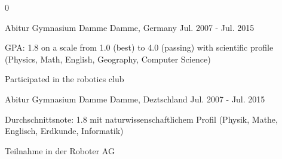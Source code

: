 \begin{cventries}
\multilang
  {0}
  {\cventry
    {Abitur} %
    {Gymnasium Damme} %
    {Damme, Germany} %
    {Jul. 2007 - Jul. 2015} %
    {
      \begin{cvitems} %
        \item {GPA: 1.8 on a scale from 1.0 (best) to 4.0 (passing) with scientific profile (Physics, Math, English, Geography, Computer Science)}
        \item {Participated in the robotics club}
      \end{cvitems}
    }
  }{\cventry
    {Abitur} %
    {Gymnasium Damme} %
    {Damme, Deztschland} %
    {Jul. 2007 - Jul. 2015} %
    {
      \begin{cvitems} %
        \item {Durchschnittsnote: 1.8 mit naturwissenschaftlichem Profil (Physik, Mathe, Englisch, Erdkunde, Informatik)}
        \item {Teilnahme in der Roboter AG}
      \end{cvitems}
    }
  }

\end{cventries}
